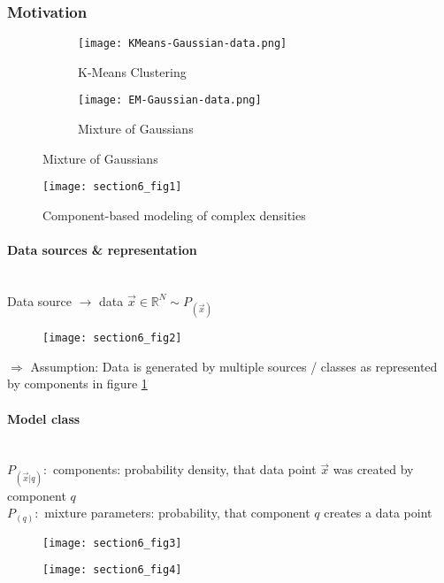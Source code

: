 \subsubsection{Motivation}
\begin{figure}[h]
    \centering
    \begin{subfigure}[b]{0.48\textwidth}
        \texttt{[image: KMeans-Gaussian-data.png]}
        \caption{K-Means Clustering}
    \end{subfigure}
    \begin{subfigure}[b]{0.48\textwidth}
        \texttt{[image: EM-Gaussian-data.png]}
        \caption{Mixture of Gaussians}
    \end{subfigure}
\end{figure}
\begin{figure}[h]
\centering
\texttt{[image: section6\_fig1]}
\caption{Component-based modeling of complex densities\citep{Bishop2006}}
\end{figure}

\paragraph{Data sources \& representation}\mbox{}\\
Data source $\rightarrow$ data $\vec{x} \in \mathbb{R}^N \sim P_{(\vec{x})}$\\
\begin{figure}[h]
  \centering
  \texttt{[image: section6\_fig2]}
  \label{fig:data_source}
\end{figure}
\vspace{-4mm}
$\Rightarrow$ Assumption: Data is generated by multiple sources / classes as represented by components in figure \ref{fig:data_source}

\paragraph{Model class}\mbox{}\\
$P_{(\vec{x} | q)}:$ components: probability density, that data point $\vec{x}$ was created by component $q$
\\\vspace{0.3cm}
$P_{(q)}:$ mixture parameters: probability, that component $q$ creates a data point
\begin{figure}[h]
	\centering
	\texttt{[image: section6\_fig3]}
\end{figure}
\begin{figure}[h]
	\centering
	\texttt{[image: section6\_fig4]}
\end{figure}

